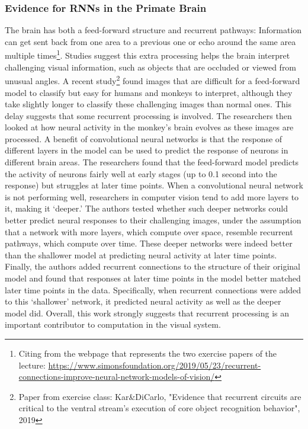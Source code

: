 \documentclass[main]{subfiles}
\begin{document}
\subsubsection{Evidence for RNNs in the Primate Brain}
The brain has both a feed-forward structure and recurrent pathways: Information can get sent back from one area to a previous one or echo around the same area multiple times\footnote{Citing from the webpage that represents the two exercise papers of the lecture: \url{https://www.simonsfoundation.org/2019/05/23/recurrent-connections-improve-neural-network-models-of-vision/}}. Studies suggest this extra processing helps the brain interpret challenging visual information, such as objects that are occluded or viewed from unusual angles. 
A recent study\footnote{Paper from exercise class: Kar\&DiCarlo, "Evidence that recurrent circuits are critical to the ventral stream’s execution of core object recognition behavior", 2019} found images that are difficult for a feed-forward model to classify but easy for humans and monkeys to interpret, although they take slightly longer to classify these challenging images than normal ones. This delay suggests that some recurrent processing is involved. The researchers then looked at how neural activity in the monkey’s brain evolves as these images are processed. A benefit of convolutional neural networks is that the response of different layers in the model can be used to predict the response of neurons in different brain areas. The researchers found that the feed-forward model predicts the activity of neurons fairly well at early stages (up to 0.1 second into the response) but struggles at later time points. When a convolutional neural network is not performing well, researchers in computer vision tend to add more layers to it, making it ‘deeper.’ The authors tested whether such deeper networks could better predict neural responses to their challenging images, under the assumption that a network with more layers, which compute over space, resemble recurrent pathways, which compute over time. These deeper networks were indeed better than the shallower model at predicting neural activity at later time points. Finally, the authors added recurrent connections to the structure of their original model and found that responses at later time points in the model better matched later time points in the data. Specifically, when recurrent connections were added to this ‘shallower’ network, it predicted neural activity as well as the deeper model did. Overall, this work strongly suggests that recurrent processing is an important contributor to computation in the visual system.
\end{document}
